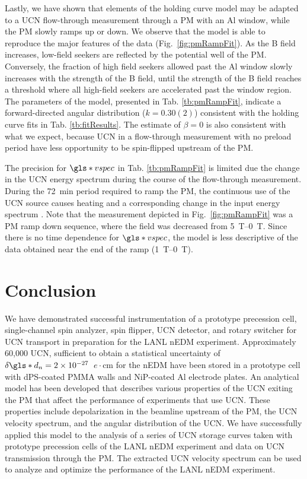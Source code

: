 Lastly, we have shown that elements of the holding curve model may be adapted to a UCN flow-through measurement through a PM with an Al window, while the PM slowly ramps up or down. We observe that the model is able to reproduce the major features of the data (Fig.~\ref{fig:pmRampFit}). As the B field increases, low-field seekers are reflected by the potential well of the PM. Conversely, the fraction of high field seekers allowed past the Al window slowly increases with the strength of the B field, until the strength of the B field reaches a threshold where all high-field seekers are accelerated past the window region. The parameters of the model, presented in Tab. \ref{tb:pmRampFit}, indicate a forward-directed angular distribution ($k=0.30(2)$) consistent with the holding curve fits in Tab. \ref{tb:fitResults}. The estimate of $\beta=0$ is also consistent with what we expect, because UCN in a flow-through measurement with no preload period have less opportunity to be spin-flipped upstream of the PM.

The precision for $\gls*{vspec}$ in Tab. \ref{tb:pmRampFit} is limited due the change in the UCN energy spectrum during the course of the flow-through measurement. During the \qty{72}{\minute} period required to ramp the PM, the continuous use of the UCN source causes heating and a corresponding change in the input energy spectrum \cite{anghel_solid_2018}. Note that the measurement depicted in Fig.~\ref{fig:pmRampFit} was a PM ramp down sequence, where the field was decreased from \qtyrange{5}{0}{\tesla}. Since there is no time dependence for $\gls*{vspec}$, the model is less descriptive of the data obtained near the end of the ramp (\qtyrange{1}{0}{\tesla}).


\section{\label{sec:summary}Conclusion}


We have demonstrated successful instrumentation of a prototype precession cell, single-channel spin analyzer, spin flipper, UCN detector, and rotary switcher for UCN transport in preparation for the LANL nEDM experiment. Approximately 60,000 UCN, sufficient to obtain a statistical uncertainty of $\delta \gls*{d_n} = 2\times 10^{-27}$~$e\cdot\text{cm}$ for the nEDM have been stored in a prototype cell with dPS-coated PMMA walls and NiP-coated Al electrode plates. An analytical model has been developed that describes various properties of the UCN exiting the PM that affect the performance of experiments that use UCN. These properties include depolarization in the beamline upstream of the PM, the UCN velocity spectrum, and the angular distribution of the UCN. We have successfully applied this model to the analysis of a series of UCN storage curves taken with prototype precession cells of the LANL nEDM experiment and data on UCN transmission through the PM. The extracted UCN velocity spectrum can be used to analyze and optimize the performance of the LANL nEDM experiment. 
